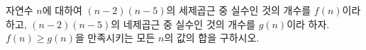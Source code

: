 자연수 $n$에 대하여 $(n-2)(n-5)$의 세제곱근 중 실수인 것의 개수를 $f(n)$이라 하고, $(n-2)(n-5)$의 네제곱근 중 실수인 것의 개수를 $g(n)$이라 하자. $f(n)\ge g(n)$을 만족시키는 모든 $n$의 값의 합을 구하시오.
